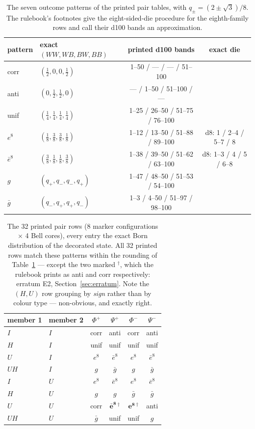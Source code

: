 \documentclass[a4paper,11pt]{article}
\begin{document}
\begin{table}[H]
\centering
\small
\begin{tabular}{llcc}
\toprule
pattern & exact $(WW, WB, BW, BB)$ & printed d100 bands & exact die \\
\midrule
corr & $(\tfrac12, 0, 0, \tfrac12)$ & 1--50 / --- / --- / 51--100 & \\
anti & $(0, \tfrac12, \tfrac12, 0)$ & --- / 1--50 / 51--100 / --- & \\
unif & $(\tfrac14, \tfrac14, \tfrac14, \tfrac14)$ & 1--25 / 26--50 / 51--75 / 76--100 & \\
$e^{8}$ & $(\tfrac18, \tfrac38, \tfrac38, \tfrac18)$ & 1--12 / 13--50 / 51--88 / 89--100 & d8: 1 / 2--4 / 5--7 / 8 \\
$\bar e^{8}$ & $(\tfrac38, \tfrac18, \tfrac18, \tfrac38)$ & 1--38 / 39--50 / 51--62 / 63--100 & d8: 1--3 / 4 / 5 / 6--8 \\
$g$ & $(q_+, q_-, q_-, q_+)$ & 1--47 / 48--50 / 51--53 / 54--100 & \\
$\bar g$ & $(q_-, q_+, q_+, q_-)$ & 1--3 / 4--50 / 51--97 / 98--100 & \\
\bottomrule
\end{tabular}
\caption{The seven outcome patterns of the printed pair tables, with
$q_\pm = (2 \pm \sqrt 3)/8$. The rulebook's footnotes give the eight-sided-die
procedure for the eighth-family rows and call their d100 bands an approximation.}
\label{tab:patterns}
\end{table}

\begin{table}[H]
\centering
\begin{tabular}{llcccc}
\toprule
member 1 & member 2 & $\Phi^+$ & $\Psi^+$ & $\Phi^-$ & $\Psi^-$ \\
\midrule
$I$ & $I$ & corr & anti & corr & anti \\
$H$ & $I$ & unif & unif & unif & unif \\
$U$ & $I$ & $e^{8}$ & $\bar e^{8}$ & $e^{8}$ & $\bar e^{8}$ \\
$UH$ & $I$ & $g$ & $\bar g$ & $g$ & $\bar g$ \\
$I$ & $U$ & $e^{8}$ & $\bar e^{8}$ & $e^{8}$ & $\bar e^{8}$ \\
$H$ & $U$ & $g$ & $g$ & $\bar g$ & $\bar g$ \\
$U$ & $U$ & corr & $\mathbf{\bar e^{8}}$\,$^\dagger$ & $\mathbf{e^{8}}$\,$^\dagger$ & anti \\
$UH$ & $U$ & $\bar g$ & unif & unif & $g$ \\
\bottomrule
\end{tabular}
\caption{The 32 printed pair rows (8 marker configurations $\times$ 4 Bell cores),
every entry the exact Born distribution of the decorated state. All 32 printed rows
match these patterns within the rounding of Table~\ref{tab:patterns} --- except the two
marked $^\dagger$, which the rulebook prints as anti and corr respectively: erratum E2,
Section~\ref{sec:erratum}. Note the $(H, U)$ row grouping by \emph{sign} rather than by
colour type --- non-obvious, and exactly right.}
\label{tab:pairs}
\end{table}
\end{document}
